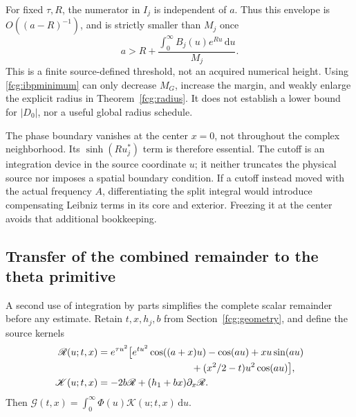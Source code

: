 \documentclass[11pt]{article}
\numberwithin{equation}{section}
\newcommand{\dd}{\,\mathrm d}
\begin{document}
For fixed $\tau,R$, the numerator in $I_j$ is independent of $a$.
Thus this envelope is $O((a-R)^{-1})$, and is strictly smaller than
$M_j$ once
\[
 a>R+\frac{\int_0^\infty B_j(u)e^{Ru}\dd u}{M_j}.
\]
This is a finite source-defined threshold, not an acquired numerical
height. Using \eqref{fcg:ibpminimum} can only decrease $M_G$,
increase the margin, and weakly enlarge the explicit radius in
Theorem~\ref{fcg:radius}. It does not establish a lower bound for
$|D_0|$, nor a useful global radius schedule.

The phase boundary vanishes at the center $x=0$, not throughout the
complex neighborhood. Its $\sinh(Ru_j^*)$ term is therefore essential.
The cutoff is an integration device in the source coordinate $u$;
it neither truncates the physical source nor imposes a spatial boundary
condition. If a cutoff instead moved with the actual frequency $A$,
differentiating the split integral would introduce compensating Leibniz
terms in its core and exterior. Freezing it at the center avoids that
additional bookkeeping.

\subsection{Transfer of the combined remainder to the theta primitive}

A second use of integration by parts simplifies the complete scalar
remainder before any estimate. Retain $t,x,h_j,b$ from
Section~\ref{fcg:geometry}, and define the source kernels
\begin{align}
 \mathscr R(u;t,x)
 &=e^{\tau u^2}\bigl[
 e^{tu^2}\cos((a+x)u)-\cos(au)+xu\sin(au)\nonumber\\
 &\hspace{34mm}+(x^2/2-t)u^2\cos(au)\bigr],\nonumber\\
 \mathscr K(u;t,x)
 &=-2b\mathscr R+(h_1+bx)\partial_x\mathscr R.
 \label{fcg:primitivekernel}
\end{align}
Then $\mathcal G(t,x)=\int_0^\infty\Phi(u)\mathscr K(u;t,x)\dd u$.
\end{document}
